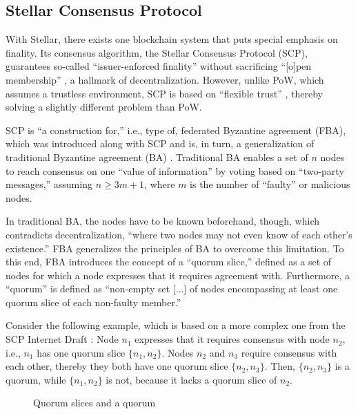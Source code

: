 \subsection{Stellar Consensus Protocol}

With Stellar, there exists one blockchain system that puts special emphasis on finality.
Its consensus algorithm, the Stellar Consensus Protocol (SCP), guarantees so-called ``issuer-enforced finality'' without sacrificing  ``[o]pen membership'' \autocite[1]{lokhava2019}, a hallmark of decentralization.
However, unlike PoW, which assumes a trustless environment, SCP is based on ``flexible trust'' \autocite[2]{mazieres2016scp}, thereby solving a slightly different problem than PoW.

SCP is ``a construction for,'' i.e., type of, federated Byzantine agreement (FBA), \autocite[2]{mazieres2016scp} which was introduced along with SCP and is, in turn, a generalization of traditional Byzantine agreement (BA) \autocite[5]{mazieres2016scp}.
Traditional BA enables a set of $n$ nodes to reach consensus on one ``value of information'' by voting based on ``two-party messages,'' assuming $n \geq 3m + 1$, where $m$ is the number of ``faulty'' or malicious nodes. \autocite{lamport1980}

In traditional BA, the nodes have to be known beforehand, though, which contradicts decentralization, ``where two nodes may not even know of each other’s existence.'' \autocite[4]{lokhava2019}
FBA generalizes the principles of BA to overcome this limitation.
To this end, FBA introduces the concept of a ``quorum slice,'' defined as  a set of nodes for which a node expresses that it requires agreement with. \autocite[4]{lokhava2019}
Furthermore, a ``quorum'' is defined as ``non-empty set [...] of nodes encompassing at least one quorum slice of each non-faulty member.'' \autocite[4]{lokhava2019}

Consider the following example, which is based on a more complex one from the SCP Internet Draft \autocite{ietf2018scp}:
Node $n_1$ expresses that it requires consensus with node $n_2$, i.e., $n_1$ has one quorum slice $\{n_1, n_2\}$.
Nodes $n_2$ and $n_3$ require consensus with each other, thereby they both have one quorum slice $\{n_2, n_3\}$.
Then, $\{n_2, n_3\}$ is a quorum, while $\{n_1, n_2\}$ is not, because it lacks a quorum slice of $n_2$.
\\
\begin{figure}[H]
	\centering
	
	\caption*{Quorum slices and a quorum}
\end{figure}

